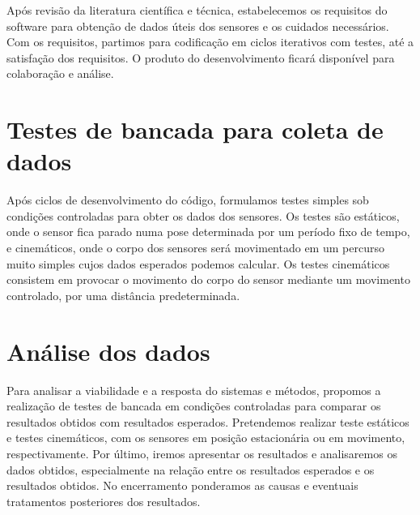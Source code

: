 Após revisão da literatura científica e técnica, estabelecemos os requisitos do software para obtenção de dados úteis dos sensores e os cuidados necessários. Com os requisitos, partimos para codificação em ciclos iterativos com testes, até a satisfação dos requisitos. O produto do desenvolvimento ficará disponível para colaboração e análise.

\section{Testes de bancada para coleta de dados}

Após ciclos de desenvolvimento do código, formulamos testes simples sob condições controladas para obter os dados dos sensores. Os testes são estáticos, onde o sensor fica parado numa pose determinada por um período fixo de tempo, e cinemáticos, onde o corpo dos sensores será movimentado em um percurso muito simples cujos dados esperados podemos calcular. Os testes cinemáticos consistem em provocar o movimento do corpo do sensor mediante um movimento controlado, por uma distância predeterminada.

\section{Análise dos dados}

Para analisar a viabilidade e a resposta do sistemas e métodos, propomos a realização de testes de bancada em condições controladas para comparar os resultados obtidos com resultados esperados. Pretendemos realizar teste estáticos e testes cinemáticos, com os sensores em posição estacionária ou em movimento, respectivamente. Por último, iremos apresentar os resultados e analisaremos os dados obtidos, especialmente na relação entre os resultados esperados e os resultados obtidos. No encerramento ponderamos as causas e eventuais tratamentos posteriores dos resultados.
